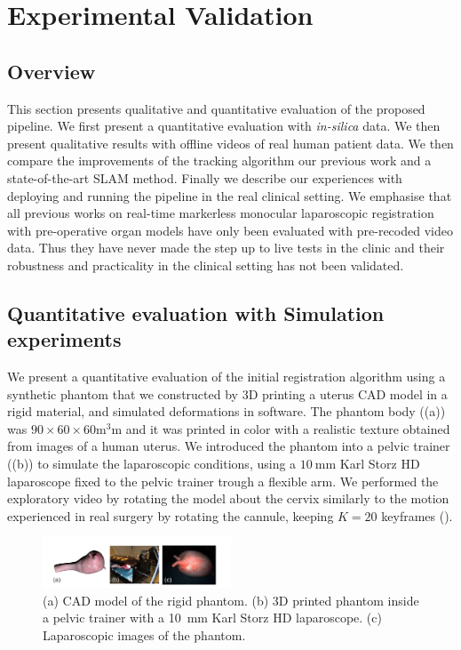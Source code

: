 
\section{Experimental Validation}
\label{sec:experiments}
\subsection{Overview}
This section presents qualitative and quantitative evaluation of the proposed pipeline. We first present a quantitative evaluation with \textit{in-silica} data. We then present qualitative results with offline videos of real human patient data. We then compare the improvements of the tracking algorithm \wrt our previous work and a state-of-the-art SLAM method. Finally we describe our experiences with deploying and running the pipeline in the real clinical setting. We emphasise that all previous works on real-time markerless monocular laparoscopic registration with pre-operative organ models have only been evaluated with pre-recoded video data. Thus they have never made the step up to live tests in the clinic and their robustness and practicality in the clinical setting has not been validated. 

\subsection{Quantitative evaluation with Simulation experiments}
We present a quantitative evaluation of the initial registration algorithm using a synthetic phantom that we constructed by 3D printing a uterus CAD model in a rigid material, and simulated deformations in software.
The phantom body ((a)) was $90 \times 60 \times 60\si{\cubic\milli\metre}$ and it was printed in color with a realistic texture obtained from images of a human uterus. We introduced the phantom into a pelvic trainer ((b)) to simulate the laparoscopic conditions, using a $\SI{10}{\milli\metre}$ Karl Storz HD laparoscope fixed to the pelvic trainer trough a flexible arm. We performed the exploratory video by rotating the model about the cervix similarly to the motion experienced in real surgery by rotating the cannule, keeping $K=20$ keyframes ().
 
\begin{figure}[htb]
  \centering
  \includegraphics[width=0.5\textwidth]{./figs/phantom.pdf}
\caption{(a) CAD model of the rigid phantom. (b) 3D printed phantom inside a pelvic trainer with a \SI{10}{\milli\metre} Karl Storz HD laparoscope. (c) Laparoscopic images of the phantom.}
\label{fig:phantom}
\end{figure}



